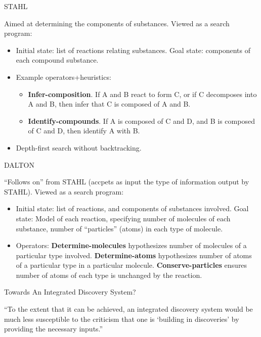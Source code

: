 \documentclass{article}
\begin{document}
\begin{slide}{}
{\Large STAHL}

Aimed at determining the components of substances. Viewed as a search program:
\begin{itemize}
\item Initial state: list of reactions relating substances. Goal
state: components of each compound substance.
\item Example operators+heuristics:
\begin{itemize}
\item {\bf Infer-composition}. If A and B react to form C, or if C
decomposes into A and B, then infer that C is composed of A and B.
\item {\bf Identify-compounds}. If A is composed of C and D, and B is
composed of C and D, then identify A with B.
\end{itemize}
\item Depth-first search without backtracking.
\end{itemize}
\end{slide}

\begin{slide}{}
{\Large DALTON}

``Follows on'' from STAHL (accpets as input the type of information
output by STAHL). Viewed as a search program:
\begin{itemize}
\item Initial state: list of reactions, and components of substances
involved. Goal state: Model of each reaction, specifying 
number of molecules of each substance, number of ``particles'' (atoms)
in each type of molecule.
\item Operators: {\bf Determine-molecules} hypothesizes number of
molecules of a particular type involved. {\bf Determine-atoms}
hypothesizes number of atoms of a particular type in a particular
molecule. {\bf Conserve-particles} ensures number of atoms of each
type is unchanged by the reaction.
\end{itemize}
\end{slide}

\begin{slide}{}
{\Large Towards An Integrated}
{\Large Discovery System?}

``To the extent that it can be achieved, an integrated discovery
system would be much less susceptible to the criticism that one is
`building in discoveries' by providing the necessary inputs.''
\end{slide}
\end{document}
